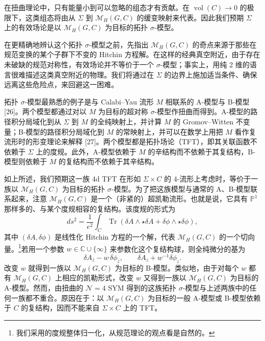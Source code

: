 \documentclass[11pt,a4paper,UTF8]{ctexart}
\begin{document}

在扭曲理论中，只有能量小到可以忽略的组态才有贡献。在 $\operatorname{vol}(C)\to0$ 的极限下，这类组态将由从 $\Sigma$ 到 $\mathcal{M}_{H}(G,C)$ 的缓变映射来代表。因此我们预期 $\Sigma$ 上的有效场论是以 $\mathcal{M}_{H}(G,C)$ 为目标的拓扑 $\sigma$-模型。

在更精确地辨认这个拓扑 $\sigma$-模型之前，先指出 $\mathcal{M}_{H}(G,C)$ 的奇点来源于那些在规范变换的某个子群下不变的 Hitchin 方程解。在这样的经典真空附近，由于存在未破缺的规范对称性，有效场论并不等价于一个 $\sigma$-模型；事实上，用纯 2 维的语言很难描述这类真空附近的物理。我们将通过在 $\Sigma$ 的边界上施加适当条件、确保远离这些危险点，来回避这一困难。

拓扑 $\sigma$-模型最熟悉的例子是与 Calabi--Yau 流形 $M$ 相联系的 A-模型与 B-模型 [26]。两个模型都通过对以 $M$ 为目标的超对称 $\sigma$-模型作扭曲而得到。A-模型的路径积分局域化到从 $\Sigma$ 到 $M$ 的全纯映射上，并计算 $M$ 的 Gromov--Witten 不变量；B-模型的路径积分局域化到 $M$ 的常映射上，并可以在数学上用把 $M$ 看作复流形时的形变理论来解释 [27]。两个模型都是拓扑场论（TFT），即其关联函数不依赖于 $\Sigma$ 上的度规。此外，A-模型依赖于 $M$ 的辛结构而不依赖于其复结构，B-模型则依赖于 $M$ 的复结构而不依赖于其辛结构。

如上所述，我们预期这一族 4d TFT 在形如 $\Sigma\times C$ 的 4-流形上考虑时，等价于一族以 $\mathcal{M}_{H}(G,C)$ 为目标的拓扑 $\sigma$-模型。为了把这族模型与通常的 A、B-模型联系起来，注意 $\mathcal{M}_{H}(G,C)$ 是一个（非紧的）超凯勒流形。也就是说，它具有 $\mathbb{P}^{1}$ 那样多的、与某个度规相容的复结构。该度规的形式为
\[
    ds^{2}=\frac{1}{e^{2}}\int_{C}\operatorname{Tr}\left(\delta A\wedge\star\delta A+\delta\phi\wedge\star\delta\phi\right),
\]
其中 $(\delta A,\delta\phi)$ 是线性化 Hitchin 方程的一个解，代表 $\mathcal{M}_{H}(G,C)$ 的一个切向量。\footnote{我们采用的度规整体归一化，从规范理论的观点看是自然的。}若用一个参数 $w\in\mathbb{C}\cup\{\infty\}$ 来参数化这个复结构球，则全纯微分的基为
\[
    \delta A_{\bar z}-w\,\delta\phi_{\bar z},\qquad
    \delta A_{z}+w^{-1}\delta\phi_{z}.
\]
改变 $w$ 就得到一族以 $\mathcal{M}_{H}(G,C)$ 为目标的 B-模型。类似地，由于对每个 $w$ 都有 $\mathcal{M}_{H}(G,C)$ 上相应的凯勒形式，改变 $w$ 又得到一族以 $\mathcal{M}_{H}(G,C)$ 为目标的 A-模型。然而，由扭曲的 $\mathcal{N}=4$ SYM 得到的这族拓扑 $\sigma$-模型与上述两族中的任何一族都不重合。原因在于：以 $\mathcal{M}_{H}(G,C)$ 为目标的一般 A-模型或 B-模型依赖于 $C$ 的复结构，因而不能来自 $\Sigma\times C$ 上的 TFT。
\end{document}
